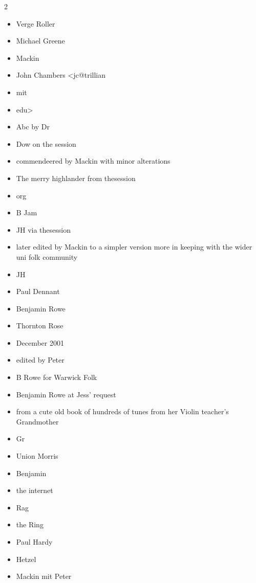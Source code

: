 \documentclass[12pt,a4paper,twoside]{article}
\begin{document}
\begin{multicols}{2}
\begin{itemize}\item Verge Roller
\item Michael Greene
\item Mackin
\item John Chambers <jc@trillian
\item mit
\item edu>
\item Abc by Dr
\item Dow on the session
\item commendeered by Mackin with minor alterations
\item The merry highlander from thesession
\item org
\item B Jam
\item JH via thesession
\item later edited by Mackin to a simpler version more in keeping with the wider uni folk community
\item JH
\item Paul Dennant
\item Benjamin Rowe
\item Thornton Rose
\item December 2001
\item edited by Peter
\item B Rowe for Warwick Folk
\item Benjamin Rowe at Jess' request
\item from a cute old book of hundreds of tunes from her Violin teacher's Grandmother
\item Gr
\item Union Morris
\item Benjamin
\item the internet
\item Rag
\item the Ring
\item Paul Hardy
\item Hetzel
\item Mackin mit Peter
\end{itemize}

\end{multicols}

\newpage


\end{document}
